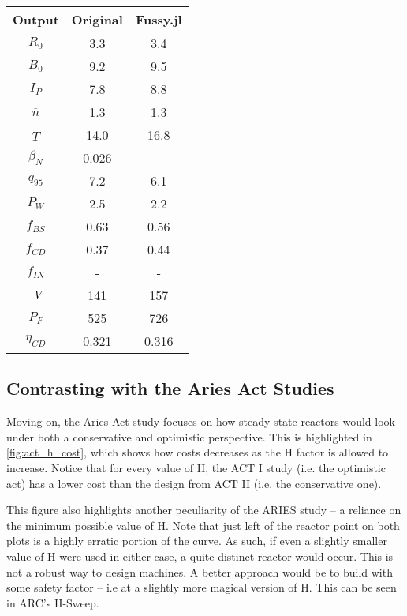 \begin{table}[h!]
\begin{subtable}[t]{0.5\textwidth}
\begin{tabular}{ c|c|c }
Output           & Original         & Fussy.jl        \\
\hline
$R_{0}$          & 3.3              & 3.4           \\
$B_{0}$          & 9.2              & 9.5           \\
$I_{P}$          & 7.8              & 8.8           \\
$\overline n$    & 1.3              & 1.3           \\
$\overline T$    & 14.0             & 16.8           \\
$\beta_{N}$       & 0.026           & -          \\
$q_{95}$         & 7.2              & 6.1           \\
$P_{W}$          & 2.5              & 2.2           \\
$f_{BS}$         & 0.63             & 0.56          \\
$f_{CD}$         & 0.37             & 0.44          \\
$f_{IN}$         & -              & -             \\
$\volume$         & 141            & 157           \\
$P_{F}$          & 525            & 726           \\
$\eta_{CD}$      & 0.321            & 0.316          \\

\end{tabular}
\end{subtable}
\hfill
\hfill
\end{table}

\newpage

\subsection{Contrasting with the Aries Act Studies}

Moving on, the Aries Act study focuses on how steady-state reactors would look under both a conservative and optimistic perspective. This is highlighted in \cref{fig:act_h_cost}, which shows how costs decreases as the H factor is allowed to increase. Notice that for every value of H, the ACT I study (i.e. the optimistic act) has a lower cost than the design from ACT II (i.e. the conservative one).

This figure also highlights another peculiarity of the ARIES study -- a reliance on the minimum possible value of H. Note that just left of the reactor point on both plots is a highly erratic portion of the curve. As such, if even a slightly smaller value of H were used in either case, a quite distinct reactor would occur. This is not a robust way to design machines. A better approach would be to build with some safety factor -- i.e at a slightly more magical version of H. This can be seen in ARC's H-Sweep.

